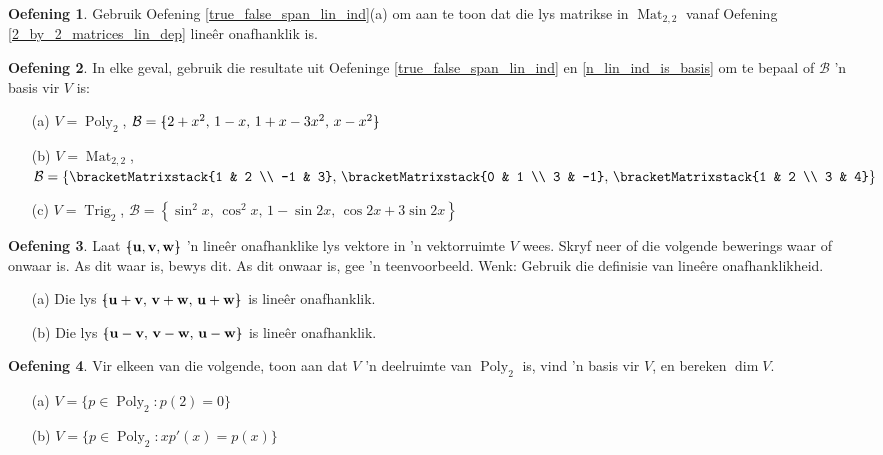 \documentclass[a4paper,11pt]{book}
\theoremstyle{definition}
\newtheorem{exercise}{Oefening}
\newcommand{\ve}[1]{\mathbf{#1}}
\newcommand{\basis}[1]{{\mathcal #1}}
\newcommand{\cmatrix}[1]{\bracketMatrixstack{#1}}
\newcommand{\bmark}{\raisebox{.53ex}{\rule{.2em}{.1ex}}}
\newcommand{\bopen}{{\protect\ooalign{\{\cr\hfil\bmark\hfil\cr}}}
\newcommand{\bclose}{{\protect\ooalign{\}\cr\hfil\bmark\hfil\cr}}}
\DeclareMathOperator{\Poly}{Poly}
\DeclareMathOperator{\Trig}{Trig}
\DeclareMathOperator{\Mat}{Mat}
\begin{document}
\begin{exercise} \label{checking_matrices_lin_dep} Gebruik Oefening
	\ref{true_false_span_lin_ind}(a) om aan te toon dat die lys matrikse in
	$\Mat_{2,2}$ vanaf Oefening \ref{2_by_2_matrices_lin_dep} line\^{e}r
	onafhanklik is.
\end{exercise}  

\begin{exercise} \label{dim_poly_at_2_ex} In elke geval, gebruik die
	resultate uit Oefeninge
	\ref{true_false_span_lin_ind} en \ref{n_lin_ind_is_basis} om te bepaal
	of $\basis{B}$ 'n basis vir $V$ is:
	\begin{itemize}
		\item[(a)] $V = \Poly_2$, $\basis{B} = \bopen 2 + x^2, \, 1-x, \, 1
			+ x - 3x^2, \, x-x^2 \bclose$
		\item[(b)] $V = \Mat_{2,2}$, $\basis{B} = \left\{ \cmatrix{1 & 2 \\
			-1 & 3}, \, \cmatrix{0 & 1 \\ 3 & -1}, \, \cmatrix{1 & 2 \\ 3 &
			4} \right\}$
		\item[(c)] $V = \Trig_2$, $\basis{B} = \left\{ \sin^2 x, \, \cos^2
			x, \, 1 - \sin 2x, \, \cos 2x + 3 \sin 2x  \right\}$
	\end{itemize}
\end{exercise}


\begin{exercise} Laat $\bopen \ve{u}, \ve{v}, \ve{w} \bclose$ 'n line\^{e}r
	onafhanklike lys vektore in 'n vektorruimte $V$ wees. Skryf neer of die
	volgende bewerings waar of onwaar is. As dit waar is, bewys dit. As dit
	onwaar is, gee 'n teenvoorbeeld. Wenk: Gebruik die definisie van
	line\^{e}re onafhanklikheid.
	\begin{itemize}
		\item[(a)] Die lys $\bopen \ve{u} + \ve{v}, \, \ve{v} + \ve{w}, \,
			\ve{u} + \ve{w} \bclose$ is line\^{e}r onafhanklik.
		\item[(b)] Die lys $\bopen \ve{u} - \ve{v}, \, \ve{v} - \ve{w}, \,
			\ve{u} - \ve{w} \bclose$ is line\^{e}r onafhanklik.
	\end{itemize}
\end{exercise}


\begin{exercise} Vir elkeen van die volgende, toon aan dat $V$ 'n
	deelruimte van $\Poly_2$ is, vind 'n basis vir $V$, en bereken $\dim
	V$.
	\begin{itemize}
		\item[(a)] $V = \{ p \in \Poly_2 : p(2) = 0 \}$
		\item[(b)] $V = \{ p \in \Poly_2 : xp'(x) = p(x) \}$
	\end{itemize}
\end{exercise}
\end{document}
